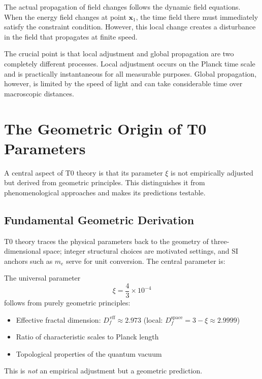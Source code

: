 	The actual propagation of field changes follows the dynamic field equations. When the energy field changes at point $\mathbf{x}_1$, the time field there must immediately satisfy the constraint condition. However, this local change creates a disturbance in the field that propagates at finite speed.
	
	The crucial point is that local adjustment and global propagation are two completely different processes. Local adjustment occurs on the Planck time scale and is practically instantaneous for all measurable purposes. Global propagation, however, is limited by the speed of light and can take considerable time over macroscopic distances.
	
	\section{The Geometric Origin of T0 Parameters}
	
	A central aspect of T0 theory is that its parameter $\xi$ is not empirically adjusted but derived from geometric principles. This distinguishes it from phenomenological approaches and makes its predictions testable.
	
	\subsection{Fundamental Geometric Derivation}
	
	T0 theory traces the physical parameters back to the geometry of three-dimensional space; integer structural choices are motivated settings, and SI anchors such as $m_e$ serve for unit conversion. The central parameter is:
	
	\begin{tcolorbox}[colback=t0blue!5!white, colframe=t0blue!75!black, title=T0 Prediction]
		The universal parameter
		\begin{equation}
			\xi = \frac{4}{3} \times 10^{-4}
		\end{equation}
		follows from purely geometric principles:
		\begin{itemize}
			\item Effective fractal dimension: $D_f^{\,\text{eff}} \approx 2.973$ (local: $D_f^{\text{space}} = 3 - \xi \approx 2.9999$)
			\item Ratio of characteristic scales to Planck length
			\item Topological properties of the quantum vacuum
		\end{itemize}
		This is \emph{not} an empirical adjustment but a geometric prediction.
	\end{tcolorbox}
	
